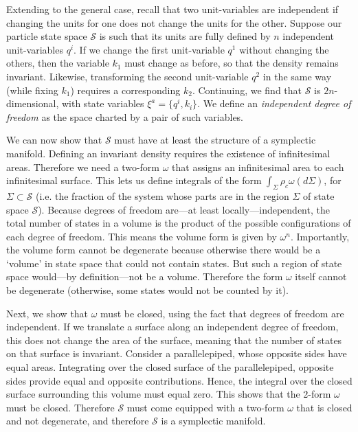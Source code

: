 \documentclass[12pt, english, twoside]{article} %
\begin{document}
Extending to the general case, recall that two unit-variables are independent if changing the units for one does not change the units for the other. Suppose our particle state space $\mathcal{S}$ is such that its units are fully defined by $n$ independent unit-variables $q^i$. If we change the first unit-variable $q^1$ without changing the others, then the variable $k_1$ must change as before, so that the density remains invariant. Likewise, transforming the second unit-variable $q^2$ in the same way (while fixing $k_1$) requires a corresponding $k_2$. Continuing, we find that $\mathcal{S}$ is $2n$-dimensional, with state variables $\xi^a = \{ q^i, k_i \}$. We define an \textit{independent degree of freedom} as the space charted by a pair of such variables.

We can now show that $\mathcal{S}$ must have at least the structure of a symplectic manifold. Defining an invariant density requires the existence of infinitesimal areas. Therefore we need a two-form $\omega$ that assigns an infinitesimal area to each infinitesimal surface. This lets us define integrals of the form $\int_{\Sigma} \rho_c \omega(d\Sigma)$, for $\Sigma \subset \mathcal{S}$ (i.e. the fraction of the system whose parts are in the region $\Sigma$ of state space $\mathcal{S}$). Because degrees of freedom are---at least locally---independent, the total number of states in a volume is the product of the possible configurations of each degree of freedom. This means the volume form is given by $\omega^n$. Importantly, the volume form cannot be degenerate because otherwise there would be a `volume' in state space that could not contain states. But such a region of state space would---by definition---not be a volume. Therefore the form $\omega$ itself cannot be degenerate (otherwise, some states would not be counted by it). 

Next, we show that $\omega$ must be closed, using the fact that degrees of freedom are independent. If we translate a surface along an independent degree of freedom, this does not change the area of the surface, meaning that the number of states on that surface is invariant. Consider a parallelepiped, whose opposite sides have equal areas. Integrating over the closed surface of the parallelepiped, opposite sides provide equal and opposite contributions. Hence, the integral over the closed surface surrounding this volume must equal zero. This shows that the 2-form $\omega$ must be closed. Therefore $\mathcal{S}$ must come equipped with a two-form $\omega$ that is closed and not degenerate, and therefore $\mathcal{S}$ is a symplectic manifold.
\end{document}

